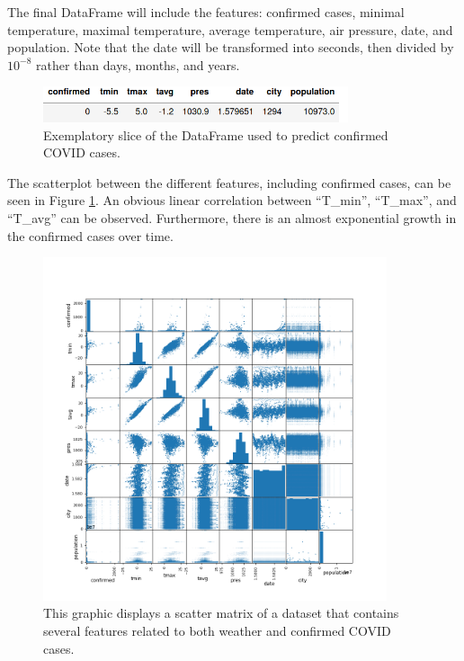 The final DataFrame will include the features: confirmed cases, minimal temperature, maximal temperature, average temperature, air pressure, date, and population. Note that the date will be transformed into seconds, then divided by $10^{-8}$ rather than days, months, and years.
\begin{figure}[H]
    \centering
    \includegraphics[width = 0.8\textwidth]{images/data_example.png}
    \caption{Exemplatory slice of the DataFrame used to predict confirmed COVID cases.}
\end{figure}
\noindent
The scatterplot between the different features, including confirmed cases, can be seen in Figure \ref{fig:scatter}.
An obvious linear correlation between \enquote{T\_min}, \enquote{T\_max}, and \enquote{T\_avg} can be observed.
Furthermore, there is an almost exponential growth in the confirmed cases over time.
\begin{figure}[H]
    \centering
    \includegraphics[width = 0.9\textwidth]{images/scatter.png}
    \caption{This graphic displays a scatter matrix of a dataset that contains several features related to both weather and confirmed COVID cases.}
    \label{fig:scatter}
\end{figure}

